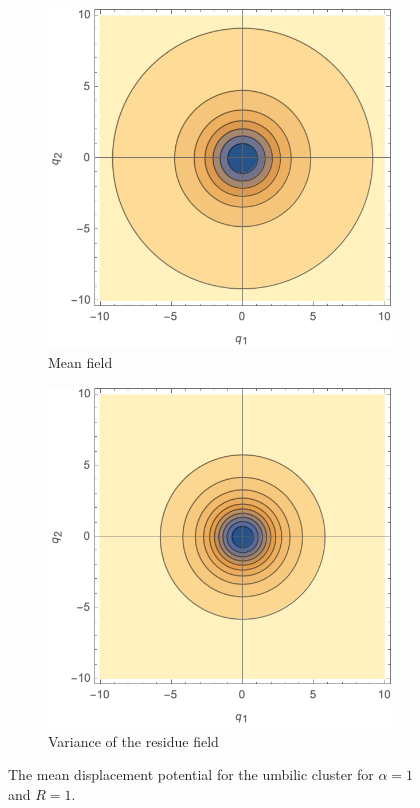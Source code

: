 \documentclass[a4paper, 11pt]{article}
\begin{document}
\begin{figure}
\centering
\begin{subfigure}[b]{0.45\textwidth}
\includegraphics[width=\textwidth]{D4Mean}
\caption{Mean field}
\end{subfigure}
\begin{subfigure}[b]{0.45\textwidth}
\includegraphics[width=\textwidth]{D4Variance}
\caption{Variance of the residue field}
\end{subfigure}
\caption{The mean displacement potential for the umbilic cluster for $\alpha =1$ and $R=1$.}
\label{fig:D4Mean}
\end{figure}
\end{document}
